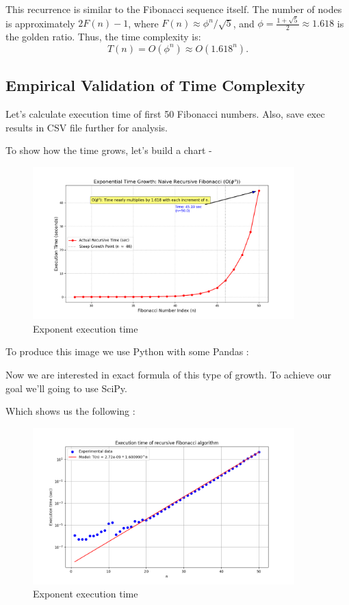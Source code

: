 \documentclass{article}
\begin{document}
This recurrence is similar to the Fibonacci sequence itself. The number of nodes is approximately \( 2F(n) - 1 \), where \( F(n) \approx \phi^n / \sqrt{5} \), and \( \phi = \frac{1 + \sqrt{5}}{2} \approx 1.618 \) is the golden ratio. Thus, the time complexity is:
\[
T(n) = O(\phi^n) \approx O(1.618^n).
\]

\subsection{Empirical Validation of Time Complexity}
Let's calculate execution time of first 50 Fibonacci numbers. Also, save exec results in CSV file further for analysis.

To show how the time grows, let's build a chart -
\begin{figure}[H]
	\centering
	\includegraphics[width=0.9\textwidth]{./recursive-time-exec/exponential-time-growth.png}
	\caption{Exponent execution time}
	\label{fig:exponent_growth}
\end{figure}

To produce this image we use Python with some Pandas :


Now we are interested in exact formula of this type of growth. To achieve our goal we'll going to use SciPy.


Which shows us the following : 
\begin{figure}[H]
	\centering
	\includegraphics[width=0.9\textwidth]{./recursive-time-exec/experimental-data-formula.png}
	\caption{Exponent execution time}
	\label{fig:experimental_vs_theoretical}
\end{figure}
\end{document}
